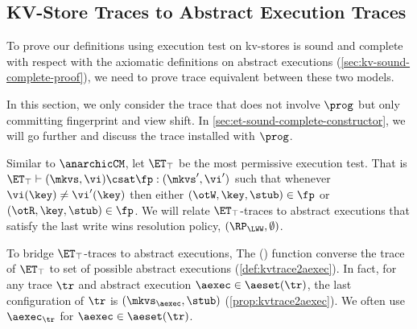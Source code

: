 \subsection{KV-Store Traces to Abstract Execution Traces}
\label{sec:kvtrace2aexec}

To prove our definitions using execution test on kv-stores 
is sound and complete with respect with the axiomatic definitions on abstract executions (\cref{sec:kv-sound-complete-proof}),
we need to prove trace equivalent between these two models.

In this section, we only consider the trace that does not involve \( \prog \) but only committing fingerprint and view shift.
In \cref{sec:et-sound-complete-constructor}, we will go further and discuss the trace installed with \( \prog \).

Similar to \(\anarchicCM \), let $\ET_\top$ be the most permissive execution test.
That is $\ET_\top \vdash (\mkvs, \vi) \csat \fp: (\mkvs',\vi')$ 
such that whenever $\vi(\key) \neq \vi'(\key)$ then either $(\otW, \key, \stub) \in \fp$ or $(\otR, \key, \stub) \in \fp$.
We will relate $\ET_{\top}$-traces to abstract executions that satisfy the last write wins resolution policy, \ie \( (\RP_{\LWW}, \emptyset) \).

To bridge $\ET_{\top}$-traces to abstract executions, 
The \aeset(\tr) function converse the trace of \( \ET_\top \) to set of possible abstract executions (\cref{def:kvtrace2aexec}).
In fact, for any trace \( \tr \) and abstract execution $\aexec \in \aeset(\tr)$, 
the last configuration of $\tr$ is $(\mkvs_{\aexec}, \stub)$ (\cref{prop:kvtrace2aexec}).
We often use \( \aexec_\tr \) for \( \aexec \in \aeset(\tr) \).

